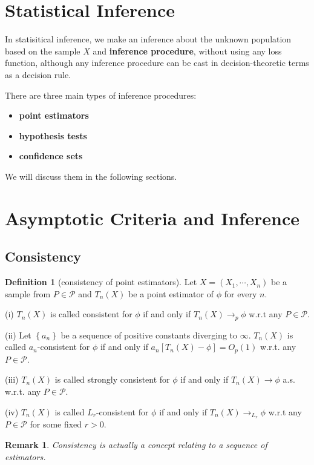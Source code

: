 \documentclass{article}
\newtheorem*{Rk}{Remark}
\theoremstyle{definition}
\newtheorem{Def}{Definition}[section]
\begin{document}
\section{Statistical Inference}
In statisitical inference, we make an inference about the unknown population based on the sample $X$ and \textbf{inference procedure}, without using any loss function, although any inference procedure can be cast in decision-theoretic terms as a decision rule.\par
There are three main types of inference procedures: 
\begin{itemize}
\item \textbf{point estimators}
\item \textbf{hypothesis tests}
\item \textbf{confidence sets}
\end{itemize}
We will discuss them in the following sections.


\section{Asymptotic Criteria and Inference}
\subsection{Consistency}
\begin{Def}[consistency of point estimators]
Let $X=(X_1,\cdots,X_n)$ be a sample from $P\in\mathcal{P}$ and $T_n(X)$ be a point estimator of $\phi$ for every $n$.\par
(i) $T_n(X)$ is called consistent for $\phi$ if and only if $T_n(X)\to_p\phi$ w.r.t any $P\in\mathcal{P}$.\par
(ii) Let $\left\{a_n\right\}$ be a sequence of positive constants diverging to $\infty$. $T_n(X)$ is called $a_n$-consistent for $\phi$ if and only if $a_n[T_n(X)-\phi]=O_p(1)$ w.r.t. any $P\in\mathcal{P}$.\par
(iii) $T_n(X)$ is called strongly consistent for $\phi$ if and only if $T_n(X)\to\phi$ a.s. w.r.t. any $P\in\mathcal{P}$.\par
(iv) $T_n(X)$ is called $L_r$-consistent for $\phi$ if and only if $T_n(X)\to_{L_r}\phi$ w.r.t any $P\in\mathcal{P}$ for some fixed $r>0$.
\end{Def}
\begin{Rk}
Consistency is actually a concept relating to a sequence of estimators.
\end{Rk}
\end{document}

